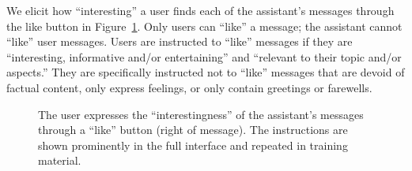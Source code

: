 We elicit how ``interesting'' a user finds each of the assistant's messages through the like button in Figure~\ref{fig:like-button}.
Only users can ``like'' a message; the assistant cannot ``like'' user messages.
Users are instructed to ``like'' messages if they are ``interesting, informative and/or entertaining'' and ``relevant to their topic and/or aspects.''
They are specifically instructed not to ``like'' messages that are devoid of factual content, only express feelings, or only contain greetings or farewells.
\begin{figure}[ht]
    \centering
    \caption{
        The user expresses the ``interestingness'' of the assistant's messages through a ``like'' button (right of message).
        The instructions are shown prominently in the full interface and repeated in training material.
    }
    \label{fig:like-button}
\end{figure}

